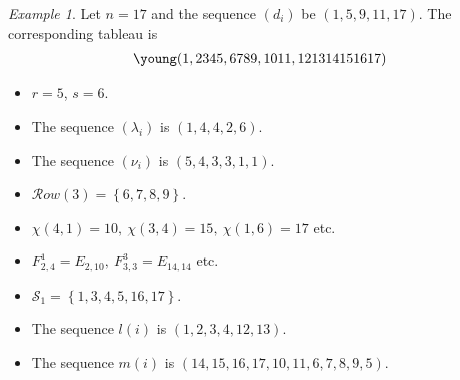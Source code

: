 \documentclass[paper=a4, fontsize=10pt]{amsart} %
\theoremstyle{plain}
\theoremstyle{definition}
\theoremstyle{remark}
\newtheorem{example}[subsection]{Example}
\numberwithin{equation}{section} %
\numberwithin{figure}{section} %
\numberwithin{table}{section} %
\numberwithin{subsection}{section} %
\newif\ifdraft
\def\E{\ensuremath{E}}
\def\fij#1.#2.{\ensuremath{\chi(#2,#1)}}
\def\row{\ensuremath{\mathcal Row}}
\def\set{\ensuremath{\mathcal{S}}}
\def\Lambda{\ensuremath{d}}
\begin{document}
\ifdraft\marginpar{example.tex}\fi
    \def\ten{10}
    \def\eleven{11}
    \def\eleven{11}
    \def\twelve{12}
    \def\thirteen{13}
    \def\fourteen{14}
    \def\fifteen{15}
    \def\sixteen{16}
    \def\seventeen{17}

\begin{example} Let $n=17$ and the sequence $(\Lambda_i)$ be $(1,5,9,11,17)$. 
The corresponding tableau is
\begin{align*}
    \young(1,2345,6789,\ten\eleven,\twelve\thirteen\fourteen\fifteen\sixteen\seventeen)
\end{align*}
\begin{itemize}
    \item $r=5$, $s=6$.
    \item The sequence $(\lambda_i)$ is $(1,4,4,2,6)$.
    \item The sequence $(\nu_i)$ is $(5,4,3,3,1,1)$.
    \item $\row(3)=\left\{6,7,8,9\right\}$.
    \item $\fij1.4.=10,\ \fij4.3.=15,\ \fij6.1.=17$ etc.
    \item $F^1_{2,4}=\E_{2,10},\ F^3_{3,3}=\E_{14,14}$ etc. 
    \item $\set_1=\left\{1,3,4,5,16,17\right\}$.
    \item The sequence $l(i)$ is $(1,2,3,4,12,13)$.
    \item The sequence $m(i)$ is $(14,15,16,17,10,11,6,7,8,9,5)$.
\end{itemize}
\end{example}
\ifdraft\marginpar{example.tex}\fi

\ifdraft\marginpar{appendix.tex}\fi
\end{document}
